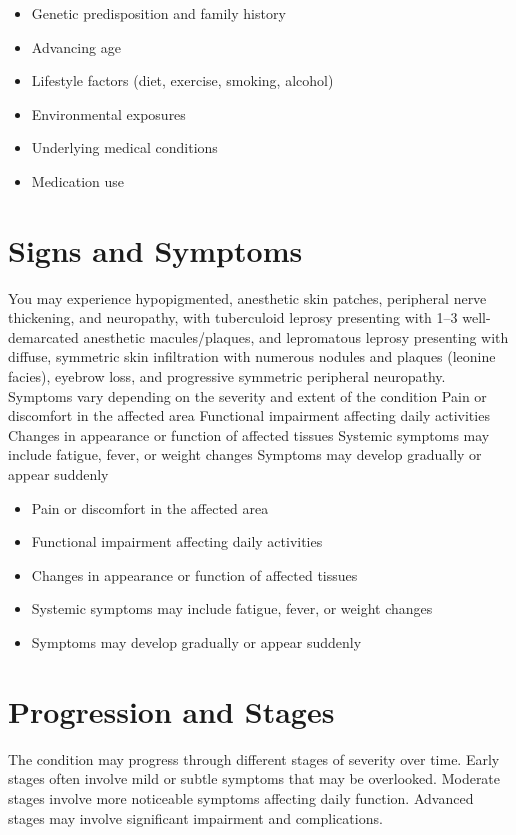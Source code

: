 \begin{itemize}[noitemsep]
  \item Genetic predisposition and family history
  \item Advancing age
  \item Lifestyle factors (diet, exercise, smoking, alcohol)
  \item Environmental exposures
  \item Underlying medical conditions
  \item Medication use
\end{itemize}
\section{Signs and Symptoms}
You may experience hypopigmented, anesthetic skin patches, peripheral nerve thickening, and neuropathy, with tuberculoid leprosy presenting with 1--3 well-demarcated anesthetic macules/plaques, and lepromatous leprosy presenting with diffuse, symmetric skin infiltration with numerous nodules and plaques (leonine facies), eyebrow loss, and progressive symmetric peripheral neuropathy. Symptoms vary depending on the severity and extent of the condition Pain or discomfort in the affected area Functional impairment affecting daily activities Changes in appearance or function of affected tissues Systemic symptoms may include fatigue, fever, or weight changes Symptoms may develop gradually or appear suddenly

\begin{itemize}[noitemsep]
  \item Pain or discomfort in the affected area
  \item Functional impairment affecting daily activities
  \item Changes in appearance or function of affected tissues
  \item Systemic symptoms may include fatigue, fever, or weight changes
  \item Symptoms may develop gradually or appear suddenly
\end{itemize}
\section{Progression and Stages}
The condition may progress through different stages of severity over time. Early stages often involve mild or subtle symptoms that may be overlooked. Moderate stages involve more noticeable symptoms affecting daily function. Advanced stages may involve significant impairment and complications.
